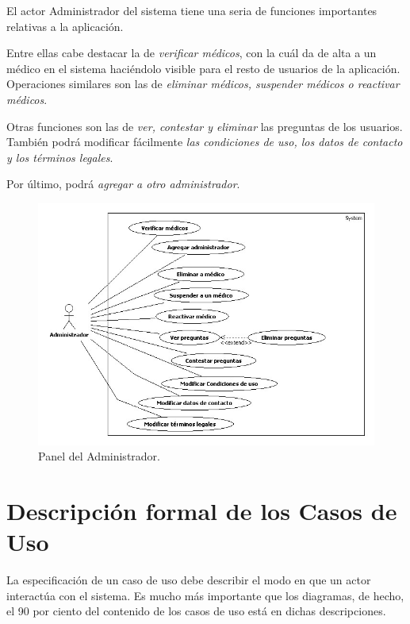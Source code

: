 \documentclass[a4paper,oneside,11pt]{book}
\begin{document}
			El actor Administrador del sistema tiene una seria de funciones importantes relativas a la aplicación. 
			
			Entre ellas cabe destacar la de \textit{verificar médicos}, con la cuál da de alta a un médico en el sistema haciéndolo visible para el resto de usuarios de la aplicación. Operaciones similares son las de \textit{eliminar médicos, suspender médicos o reactivar médicos}. 
			
			Otras funciones son las de \textit{ver, contestar y eliminar} las preguntas de los usuarios. También podrá modificar fácilmente \textit{las condiciones de uso, los datos de contacto y los términos legales}. 
			
			Por último, podrá \textit{agregar a otro administrador}.
			
			\begin{figure}[H]
			  \centering
			    \includegraphics[width=15cm]{img/jpg/casos_uso/Panel_de_Administrador.jpg}
			  \caption{Panel del Administrador.}
			  \label{fig:panel_admin}
			\end{figure}
					
	
	\newpage
	\section{Descripción formal de los Casos de Uso} %
	\label{sub:descripcion_formal_de_los_casos_de_uso}
		
		La especificación de un caso de uso debe describir el modo en que un actor interactúa con el sistema. Es mucho más importante que los diagramas, de hecho, el 90 por ciento del contenido de los casos de uso está en dichas descripciones.
			
\end{document}
